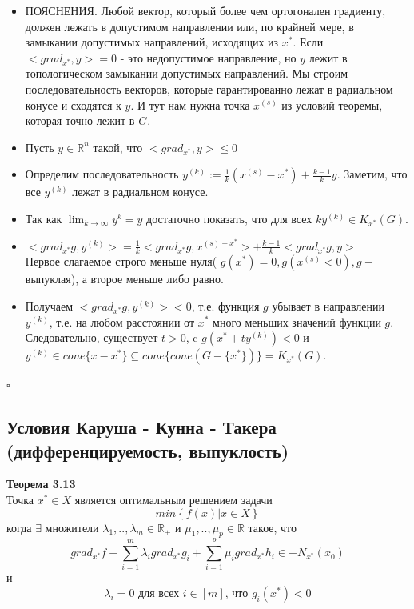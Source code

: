 \begin{enumerate}
\begin{itemize}
         \item ПОЯСНЕНИЯ. Любой вектор, который более чем ортогонален градиенту, должен лежать в допустимом направлении или, по крайней мере, в замыкании допустимых направлений, исходящих из $x^*$. Если $<grad_{x^*},y>=0$ - это недопустимое направление, но $y$ лежит в топологическом замыкании допустимых направлений. Мы строим последовательность векторов, которые гарантированно лежат в радиальном конусе и сходятся к $y$. И тут нам нужна точка $x^{(s)}$ из условий теоремы, которая точно лежит в $G$.
         \item Пусть $y\in \mathbb{R}^n$ такой, что $<grad_{x^*},y>\leq 0$
         \item Определим последовательность $y^{(k)}:=\frac{1}{k}(x^{(s)}-x^*)+\frac{k-1}{k}y$. Заметим, что все $y^{(k)}$ лежат в радиальном конусе.
         \item Так как $\displaystyle \lim_{k \to \infty} y^k = y$ достаточно показать, что для всех $k y^{(k)}\in K_{x^*}(G)$.
         \item $<grad_{x^*} g, y^{(k)}>=\frac{1}{k}<grad_{x^*}g,x^{(s)-x^*}>+\frac{k-1}{k}<grad_{x^*}g,y>$
             \\ Первое слагаемое строго меньше нуля( $g(x^*)=0, g(x^{(s)}<0), g - $ выпуклая), а второе меньше либо равно.
         \item Получаем $<grad_{x^*}g,y^{(k)}><0$, т.е. функция $g$ убывает в направлении $y^{(k)}$, т.е. на любом расстоянии от $x^*$ много меньших значений функции $g$.\\
         Следовательно, существует $t>0$, c $g(x^*+t y^{(k)})<0$ и $y^{(k)}\in cone\{x-x^*\}\subseteq cone\{cone(G-\{x^*\})\}=K_{x^*}(G)$.
         \end{itemize}
         \begin{flushright} $\square$
         \end{flushright}
\end{enumerate}

\subsection{Условия Каруша - Кунна - Такера (дифференцируемость, выпуклость)}
{\bf Теорема 3.13}\\ Точка $x^{*} \in X$ является оптимальным решением задачи \begin{equation*} min\left\lbrace f(x) | x\in X \right\rbrace \end{equation*} когда $\exists$ множители $\lambda_1,..,\lambda_m \in \mathbb{R_{+}}$ и $\mu_1,..,\mu_p \in \mathbb{R}$ такое, что \begin{equation*} \tag{1} grad_{x^{*}}f + \displaystyle\sum_{i=1}^{m} \lambda_i grad_{x^{*}}g_i + \displaystyle\sum_{i=1}^{p} \mu_i grad_{x^{*}}h_i \in - N_{x^{*}}\left(x_0\right) \end{equation*} и \begin{equation*} \tag{2} \lambda_i=0 \text{ для всех } i \in \left[m\right] \text{, что } g_i\left(x^{*}\right)<0 \end{equation*}
